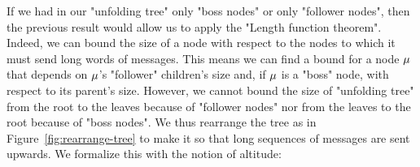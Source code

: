 
If we had in our "unfolding tree" only "boss nodes" or only "follower nodes", then the previous result would allow us to apply the "Length function theorem". Indeed, we can bound the size of a node with respect to the nodes to which it must send long words of messages. This means we can find a bound for a node $\mu$ that depends on $\mu$'s "follower" children's size and, if $\mu$ is a "boss" node, with respect to its parent's size. However, we cannot bound the size of "unfolding tree" from the root to the leaves because of "follower nodes" nor from the leaves to the root because of "boss nodes". We thus rearrange the tree as in Figure~\ref{fig:rearrange-tree} to make it so that long sequences of messages are sent upwards. We formalize this with the notion of altitude:

